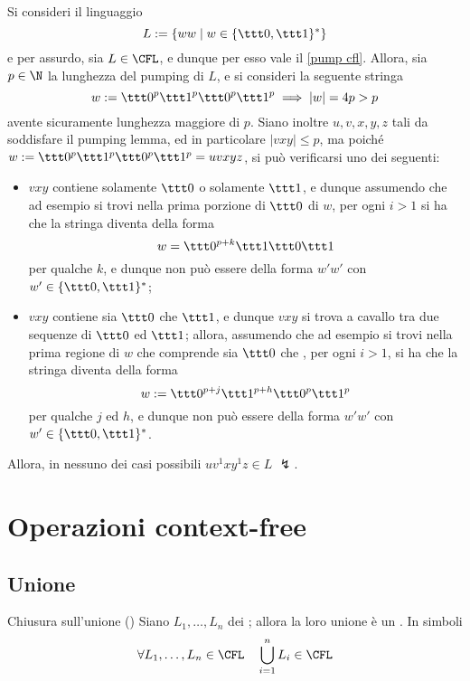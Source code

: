 \documentclass[a4paper, 12pt]{report}
\begin{document}
    \begin{example}
        \label{pump cfl ex2}
        Si consideri il linguaggio $$L := \{ww \mid w \in \{\ttt 0, \ttt 1\}^*\}$$ e per assurdo, sia $L \in \mathrm{\CFL}$, e dunque per esso vale il \cref{pump cfl}. Allora, sia $p \in \N$ la lunghezza del pumping di $L$, e si consideri la seguente stringa $$w := \ttt 0 ^p \ttt 1 ^p \ttt 0 ^p \ttt 1 ^p \implies |w| = 4p > p$$ avente sicuramente lunghezza maggiore di $p$. Siano inoltre $u, v, x, y, z$ tali da soddisfare il pumping lemma, ed in particolare $|vxy| \le p$, ma poiché $w := \ttt 0^p \ttt 1^p \ttt 0^p \ttt 1^p = uvxyz$, si può verificarsi uno dei seguenti:

        \begin{itemize}
            \item $vxy$ contiene solamente $\ttt 0$ o solamente $\ttt 1$, e dunque assumendo che ad esempio si trovi nella prima porzione di $\ttt 0$ di $w$, per ogni $i > 1$ si ha che la stringa diventa della forma $$w = \ttt 0 ^{p + k} \ttt 1 \ttt 0 \ttt 1$$ per qualche $k$, e dunque non può essere della forma $w'w'$ con $w' \in \{\ttt 0, \ttt1\}^*$;
            \item $vxy$ contiene sia $\ttt 0$ che $\ttt 1$, e dunque $vxy$ si trova a cavallo tra due sequenze di $\ttt 0$ ed $\ttt 1$; allora, assumendo che ad esempio si trovi nella prima regione di $w$ che comprende sia $\ttt 0$ che , per ogni $i > 1$, si ha che la stringa diventa della forma $$w := \ttt 0 ^{p + j} \ttt 1 ^{p + h} \ttt 0 ^p \ttt 1 ^ p$$ per qualche $j$ ed $h$, e dunque non può essere della forma $w'w'$ con $w' \in \{\ttt 0, \ttt 1\}^*$.
        \end{itemize}
        
        Allora, in nessuno dei casi possibili $u v^1 x y^1 z \in L$ $\lightning$.
    \end{example}

    \section{Operazioni context-free}

    \subsection{Unione}

    \begin{framedprop}{Chiusura sull'unione (\CFL)}
        Siano $L_1, \ldots, L_n$ dei \CFL; allora la loro unione è un \CFL. In simboli $$\forall L_1, \ldots, L_n \in \CFL \quad \displaystyle \bigcup_{i =1}^n{L_i} \in \CFL$$
    \end{framedprop}
\end{document}
